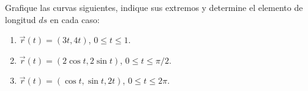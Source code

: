Grafique las curvas siguientes, indique sus extremos y determine el elemento de longitud $ds$ en cada caso:
\begin{enumerate}
    \item $\vec r(t)=(3t,4t)$, $0\leq t\leq1$.
    \item $\vec r(t)=(2\cos t,2\sin t)$, $0\leq t\leq\pi/2$.
    \item $\vec r(t)=(\cos t,\sin t,2t)$, $0\leq t\leq2\pi$.
\end{enumerate}
